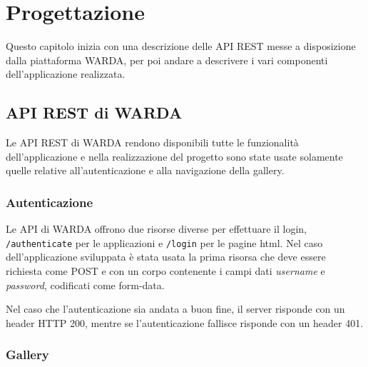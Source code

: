 
\chapter{Progettazione}
\label{cap:progettazione}


Questo capitolo inizia con una descrizione delle API REST messe a disposizione dalla piattaforma WARDA, per poi andare a descrivere i vari componenti dell'applicazione realizzata.


\section{API REST di WARDA}

Le API REST di WARDA rendono disponibili tutte le funzionalità dell'applicazione e nella realizzazione del progetto sono state usate solamente quelle relative all'autenticazione e alla navigazione della gallery.

\subsection{Autenticazione}

Le API di WARDA offrono due risorse diverse per effettuare il login, \texttt{/authenticate} per le applicazioni e \texttt{/login} per le pagine html.
Nel caso dell'applicazione sviluppata è stata usata la prima risorsa che deve essere richiesta come POST e con un corpo contenente i campi dati \textit{username} e \textit{password}, codificati come form-data.

Nel caso che l'autenticazione sia andata a buon fine, il server risponde con un header HTTP 200, mentre se l'autenticazione fallisce risponde con un header 401.

\subsection{Gallery}

